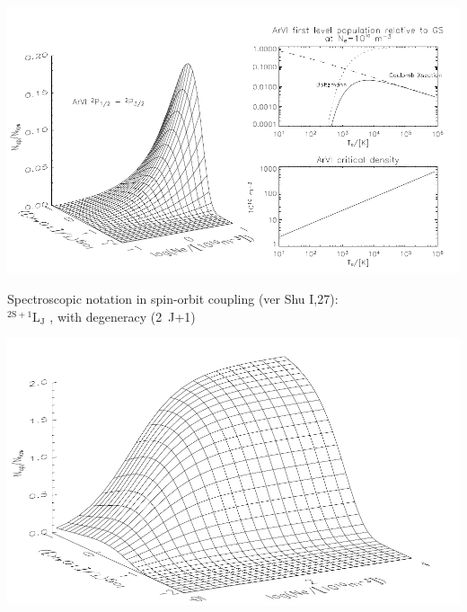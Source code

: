 \foilhead{}

\begin{center}
\includegraphics[width=25cm,height=!]{./B/ArVI_pop.pdf}
\end{center}

\foilhead{}

Spectroscopic notation in spin-orbit coupling (ver Shu
I,27):
\LARGE \\ \medskip
\( \mathrm{^{2S+1} L_J   } \) \normalsize, with degeneracy (2~J+1)

\begin{center}
\includegraphics[width=20cm,height=!]{./B/ArVI_pop_xtd.pdf}
\end{center}




